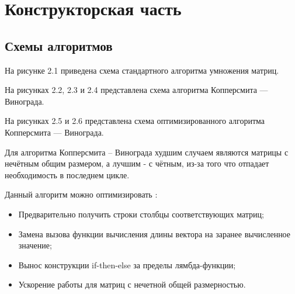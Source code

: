\documentclass[12pt]{report}
\begin{document}
\chapter{Конструкторская часть}

\section{Схемы алгоритмов}

На рисунке 2.1 приведена схема стандартного алгоритма умножения матриц.

На рисунках 2.2, 2.3 и 2.4 представлена схема алгоритма Копперсмита — Винограда.

На рисунках 2.5 и 2.6 представлена схема оптимизированного алгоритма Копперсмита — Винограда. 

Для алгоритма Копперсмита -- Винограда худшим случаем являются матрицы с нечётным общим размером, а лучшим - с чётным, из-за того что отпадает необходимость в последнем цикле.

Данный алгоритм можно оптимизировать \cite{optimize}:
\begin{itemize}
	\item Предварительно получить строки столбцы соответствующих матриц;
	\item Замена вызова функции вычисления длины вектора на заранее вычисленное значение;
	\item Вынос конструкции if-then-else за пределы лямбда-функции;
	\item Ускорение работы для матриц с нечетной общей размерностью.
\end{itemize}
\end{document}
